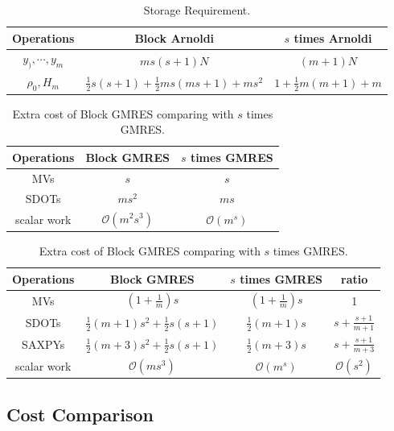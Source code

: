 \begin{table}[htbp]
	\renewcommand{\arraystretch}{1.4}
	\small	
	\caption{Storage Requirement.}
	\label{block-arnoldi-memory}
	\centering
	\begin{tabular}{c|c|c}
		\toprule
		Operations & Block Arnoldi & $s$ times Arnoldi  \\
		\midrule
		$y_),\cdots,  y_m$ & $ms(s+1)N$ & $(m+1)N$   \\
		$\rho_0,H_m$ & $\frac{1}{2}s(s+1)+\frac{1}{2}ms(ms+1)+ms^2$ & $1+\frac{1}{2}m(m+1)+m$ \\
		\bottomrule
	\end{tabular}
\end{table}


\begin{table}[htbp]
	\renewcommand{\arraystretch}{1.4}
	\small	
	\caption{Extra cost of Block GMRES comparing with $s$ times GMRES.}
	\label{block-gmres-extra}
	\centering
	\begin{tabular}{c|c|c}
		\toprule
		Operations & Block GMRES & $s$ times GMRES  \\
		\midrule
		MVs  & $s$ & $s$ \\
		SDOTs & $ms^2$ & $ms$   \\
		scalar work & $\mathcal{O}(m^2s^3)$ & $\mathcal{O}(m^s)$ \\
		\bottomrule
	\end{tabular}
\end{table}

\begin{table}[htbp]
	\renewcommand{\arraystretch}{1.4}
	\small	
	\caption{Extra cost of Block GMRES comparing with $s$ times GMRES.}
	\label{block-gmres}
	\centering
	\begin{tabular}{c|c|c|c}
		\toprule
		Operations & Block GMRES & $s$ times GMRES & ratio  \\
		\midrule
		MVs  & $(1+\frac{1}{m})s$ & $(1+\frac{1}{m})s$ & 1\\
		SDOTs & $\frac{1}{2}(m+1)s^2+\frac{1}{2}s(s+1)$ & $\frac{1}{2}(m+1)s$ & $s+\frac{s+1}{m+1}$   \\
		SAXPYs &  $\frac{1}{2}(m+3)s^2+\frac{1}{2}s(s+1)$ & $\frac{1}{2}(m+3)s$ & $s+\frac{s+1}{m+3}$ \\
		scalar work & $\mathcal{O}(ms^3)$ & $\mathcal{O}(m^s)$& $\mathcal{O}(s^2)$\\
		\bottomrule
	\end{tabular}
\end{table}

\subsection{Cost Comparison}


